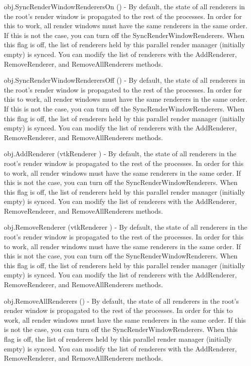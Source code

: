 \begin{DoxyItemize}
\item {\ttfamily obj.\-Sync\-Render\-Window\-Renderers\-On ()} -\/ By default, the state of all renderers in the root's render window is propagated to the rest of the processes. In order for this to work, all render windows must have the same renderers in the same order. If this is not the case, you can turn off the Sync\-Render\-Window\-Renderers. When this flag is off, the list of renderers held by this parallel render manager (initially empty) is synced. You can modify the list of renderers with the Add\-Renderer, Remove\-Renderer, and Remove\-All\-Renderers methods.  
\item {\ttfamily obj.\-Sync\-Render\-Window\-Renderers\-Off ()} -\/ By default, the state of all renderers in the root's render window is propagated to the rest of the processes. In order for this to work, all render windows must have the same renderers in the same order. If this is not the case, you can turn off the Sync\-Render\-Window\-Renderers. When this flag is off, the list of renderers held by this parallel render manager (initially empty) is synced. You can modify the list of renderers with the Add\-Renderer, Remove\-Renderer, and Remove\-All\-Renderers methods.  
\item {\ttfamily obj.\-Add\-Renderer (vtk\-Renderer )} -\/ By default, the state of all renderers in the root's render window is propagated to the rest of the processes. In order for this to work, all render windows must have the same renderers in the same order. If this is not the case, you can turn off the Sync\-Render\-Window\-Renderers. When this flag is off, the list of renderers held by this parallel render manager (initially empty) is synced. You can modify the list of renderers with the Add\-Renderer, Remove\-Renderer, and Remove\-All\-Renderers methods.  
\item {\ttfamily obj.\-Remove\-Renderer (vtk\-Renderer )} -\/ By default, the state of all renderers in the root's render window is propagated to the rest of the processes. In order for this to work, all render windows must have the same renderers in the same order. If this is not the case, you can turn off the Sync\-Render\-Window\-Renderers. When this flag is off, the list of renderers held by this parallel render manager (initially empty) is synced. You can modify the list of renderers with the Add\-Renderer, Remove\-Renderer, and Remove\-All\-Renderers methods.  
\item {\ttfamily obj.\-Remove\-All\-Renderers ()} -\/ By default, the state of all renderers in the root's render window is propagated to the rest of the processes. In order for this to work, all render windows must have the same renderers in the same order. If this is not the case, you can turn off the Sync\-Render\-Window\-Renderers. When this flag is off, the list of renderers held by this parallel render manager (initially empty) is synced. You can modify the list of renderers with the Add\-Renderer, Remove\-Renderer, and Remove\-All\-Renderers methods.  

\end{DoxyItemize}
